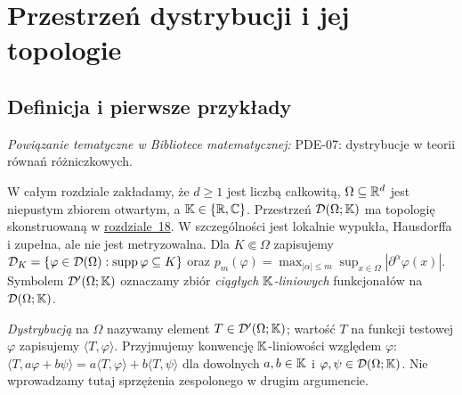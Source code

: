
\section{Przestrzeń dystrybucji i jej topologie}
\label{sec:dystrybucje19}

\providecommand{\atlasref}[2]{#2}


\subsection{Definicja i pierwsze przykłady}

\noindent\emph{Powiązanie tematyczne w Bibliotece matematycznej:} \atlasref{PDE-07::def:pde7-distribution}{PDE-07: dystrybucje w teorii równań różniczkowych}.


W całym rozdziale zakładamy, że $d\ge1$ jest liczbą całkowitą,
$\Omega\subseteq\mathbb R^d$ jest niepustym zbiorem otwartym,
a $\mathbb K\in\{\mathbb R,\mathbb C\}$.
Przestrzeń $\mathcal D(\Omega;\mathbb K)$ ma topologię skonstruowaną
w \hyperref[sec:funkcje-testowe18]{rozdziale~18}. W szczególności
jest lokalnie wypukła, Hausdorffa i zupełna, ale nie jest
metryzowalna. Dla $K\Subset\Omega$ zapisujemy
$\mathcal D_K=\{\varphi\in\mathcal D(\Omega):\operatorname{supp}\varphi\subseteq K\}$
oraz $p_m(\varphi)=\max_{|\alpha|\le m}\sup_{x\in\Omega}
|\partial^\alpha\varphi(x)|$. Symbolem $\mathcal D'(\Omega;\mathbb K)$
oznaczamy zbiór \emph{ciągłych $\mathbb K$-liniowych} funkcjonałów
na $\mathcal D(\Omega;\mathbb K)$.

\begin{definicja}[Dystrybucja]
\label{def:distribution19}
\emph{Dystrybucją} na $\Omega$ nazywamy element
$T\in\mathcal D'(\Omega;\mathbb K)$; wartość $T$ na funkcji
testowej $\varphi$ zapisujemy $\langle T,\varphi\rangle$.
Przyjmujemy konwencję $\mathbb K$-liniowości względem $\varphi$:
$\langle T,a\varphi+b\psi\rangle=a\langle T,\varphi\rangle+
b\langle T,\psi\rangle$ dla dowolnych $a,b\in\mathbb K$
i $\varphi,\psi\in\mathcal D(\Omega;\mathbb K)$.
Nie wprowadzamy tutaj sprzężenia
zespolonego w drugim argumencie.
\end{definicja}

